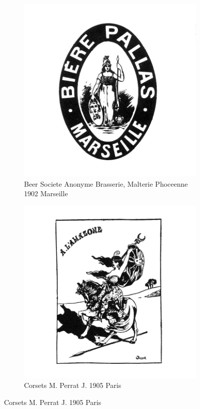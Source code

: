 \begin{figure}[h]
  \begin{subfigure}{.45\textwidth}
    \centering
    \includegraphics[width=.5\linewidth]{images/supplement/trademarks/french/2_3}
    \caption[]{Beer Societe Anonyme Brasserie, Malterie Phoceenne 1902 Marseille}
    \label{fig:trademarks:french:2.3}
  \end{subfigure}\hfill
  \begin{subfigure}{.45\textwidth}
    \centering
    \includegraphics[width=.5\linewidth]{images/supplement/trademarks/french/2_4}
    \caption[]{Corsets M. Perrat J. 1905 Paris}
    \label{fig:trademarks:french:2.4}
  \end{subfigure}


\end{figure}
